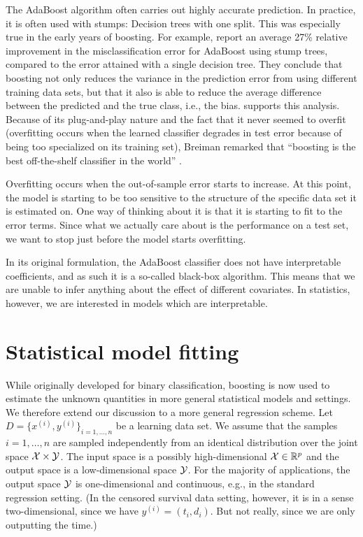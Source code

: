 The AdaBoost algorithm often carries out highly accurate prediction. In practice, it is often used with stumps: Decision trees with one split. This was especially true in the early years of boosting. For example, \citet{bauer-kohavi} report an average 27\% relative improvement in the misclassification error for AdaBoost using stump trees, compared to the error attained with a single decision tree. They conclude that boosting not only reduces the variance in the prediction error from using different training data sets, but that it also is able to reduce the average difference between the predicted and the true class, i.e., the bias. \citet{breiman1998} supports this analysis. Because of its plug-and-play nature and the fact that it never seemed to overfit (overfitting occurs when the learned classifier degrades in test error because of being too specialized on its training set), Breiman remarked that ``boosting is the best off-the-shelf classifier in the world'' \citep{ESL}.

Overfitting occurs when the out-of-sample error starts to increase. At this point, the model is starting to be too sensitive to the structure of the specific data set it is estimated on. One way of thinking about it is that it is starting to fit to the error terms. Since what we actually care about is the performance on a test set, we want to stop just before the model starts overfitting.

In its original formulation, the AdaBoost classifier does not have interpretable coefficients, and as such it is a so-called black-box algorithm. This means that we are unable to infer anything about the effect of different covariates. In statistics, however, we are interested in models which are interpretable.


\section{Statistical model fitting}
While originally developed for binary classification, boosting is now used to estimate the unknown quantities in more general statistical models and settings. We therefore extend our discussion to a more general regression scheme. Let $D=\{x^{(i)},y^{(i)}\}_{i=1,\ldots,n}$ be a learning data set. We assume that the samples $i=1,\ldots,n$ are sampled independently from an identical distribution over the joint space $\mathcal{X}\times\mathcal{Y}$. The input space is a possibly high-dimensional $\mathcal{X}\in\mathbb{R}^p$ and the output space is a low-dimensional space $\mathcal{Y}$. For the majority of applications, the output space $\mathcal{Y}$ is one-dimensional and continuous, e.g., in the standard regression setting. (In the censored survival data setting, however, it is in a sense two-dimensional, since we have $y^{(i)}=(t_i,d_i)$. But not really, since we are only outputting the time.)

